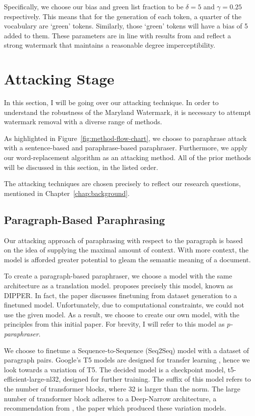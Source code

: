 \documentclass{l4proj}
\theoremstyle{definition}
\newcommand{\codefont}[1]{{\fontfamily{lmtt}\selectfont #1}}
\begin{document}
        Specifically, we choose our bias and green list fraction to be $\delta = 5$ and $\gamma = 0.25$ respectively. This means that for the generation of each token, a quarter of the vocabulary are `green' tokens. Similarly, those `green' tokens will have a bias of 5 added to them. These parameters are in line with results from \citet{kirchenbauer2023watermark} and reflect a strong watermark that maintains a reasonable degree imperceptibility.

\section{Attacking Stage}
    In this section, I will be going over our attacking technique. In order to understand the robustness of the Maryland Watermark, it is necessary to attempt watermark removal with a diverse range of methods. 

    As highlighted in Figure~\ref{fig:method-flow-chart}, we choose to paraphrase attack with a sentence-based and paraphrase-based paraphraser. Furthermore, we apply our word-replacement algorithm as an attacking method. All of the prior methods will be discussed in this section, in the listed order.

    The attacking techniques are chosen precisely to reflect our research questions, mentioned in Chapter~\ref{chap:background}.

    \subsection{Paragraph-Based Paraphrasing}
        \label{sec:paragraph-paraphraser}
        Our attacking approach of paraphrasing with respect to the paragraph is based on the idea of supplying the maximal amount of context. With more context, the model is afforded greater potential to gleam the semantic meaning of a document. 
    
        To create a paragraph-based paraphraser, we choose a model with the same architecture as a translation model. \citet{krishna2023paraphrasing} proposes precisely this model, known as DIPPER. In fact, the paper discusses finetuning from dataset generation to a finetuned model. Unfortunately, due to computational constraints, we could not use the given model. As a result, we choose to create our own model, with the principles from this initial paper. For brevity, I will refer to this model as \emph{$p$-paraphraser}.
        
        We choose to finetune a Sequence-to-Sequence (Seq2Seq) model with a dataset of paragraph pairs. Google's T5 models are designed for transfer learning \citep{raffel2023exploring}, hence we look towards a variation of T5. The decided model is a checkpoint model, \codefont{t5-efficient-large-nl32}, designed for further training. The suffix of this model refers to the number of transformer blocks, where 32 is larger than the norm. The large number of transformer block adheres to a Deep-Narrow architecture, a recommendation from \citet{tay2022scale}, the paper which produced these variation models.
\end{document}
